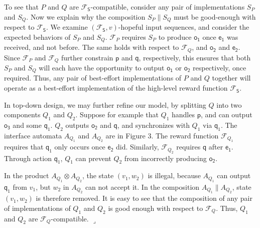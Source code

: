 \documentclass[10pt,a4paper]{article}
\begin{document}
To see that $P$ and $Q$ are $\mathcal{F}_{\mathsf{S}}$-compatible, consider any pair of implementations $S_{P}$ and $S_{Q}$. Now we explain why the composition $S_{P}\parallel S_{Q}$ must be good-enough with respect to $\mathcal{F}_{\mathsf{S}}$. We examine $(\mathcal{F}_{\mathsf{S}},v)$-hopeful input sequences, and consider the expected behaviors of $S_{P}$ and $S_{Q}$. $\mathcal{F}_{P}$ requires $S_{P}$ to produce $\mathsf{o_{1}}$ once $\mathsf{e_{1}}$ was received, and not before. The same holds with respect to $\mathcal{F}_{Q}$, and $\mathsf{o_{2}}$ and $\mathsf{e_{2}}$. Since $\mathcal{F}_{P}$ and $\mathcal{F}_{Q}$ further constrain $\mathsf{p}$ and $\mathsf{q}$, respectively, this ensures that both $S_{P}$ and $S_{Q}$ will each have the opportunity to output $\mathsf{o_{1}}$ or $\mathsf{o_{2}}$ respectively, once required. Thus, any pair of best-effort implementations of $P$ and $Q$ together will operate as a best-effort implementation of the high-level reward function $\mathcal{F}_{\mathsf{S}}$.\par
 
 
 
In top-down design, we may further refine our model, by splitting $Q$ into two components $Q_{1}$ and $Q_{2}$. Suppose for example that $Q_{1}$ handles $\mathsf{p}$, and can output $\mathsf{o_{3}}$ and some $\mathsf{q}_{1}$. $Q_{2}$ outputs $\mathsf{o_{2}}$ and $\mathsf{q}$, and synchronizes with $Q_{1}$ via $\mathsf{q}_{1}$. The interface automata $A_{Q_{1}}$ and $A_{Q_{2}}$ are in Figure 3. The reward function $\mathcal{F}_{Q_{1}}$ requires that $\mathsf{q}_{1}$ only occurs once $\mathsf{e_{2}}$ did. Similarly, $\mathcal{F}_{Q_{2}}$ requires $\mathsf{q}$ after $\mathsf{e_{1}}$. Through action $\mathsf{q}_{1}$, $Q_{1}$ can prevent $Q_{2}$ from incorrectly producing $\mathsf{o_{2}}$.\par
 
 
 
In the product $A_{Q_{1}}\otimes A_{Q_{2}}$, the state $(v_{1},w_{2})$ is illegal, because $A_{Q_{1}}$ can output $\mathsf{q}_{1}$ from $v_{1}$, but $w_{2}$ in $A_{Q_{2}}$ can not accept it. In the composition $A_{Q_{1}}\parallel A_{Q_{2}}$, state $(v_{1},w_{2})$ is therefore removed. It is easy to see that the composition of any pair of implementations of $Q_{1}$ and $Q_{2}$ is good enough with respect to $\mathcal{F}_{Q}$. Thus, $Q_{1}$ and $Q_{2}$ are $\mathcal{F}_{Q}$-compatible. $\lrcorner$\par
 
\end{document}
